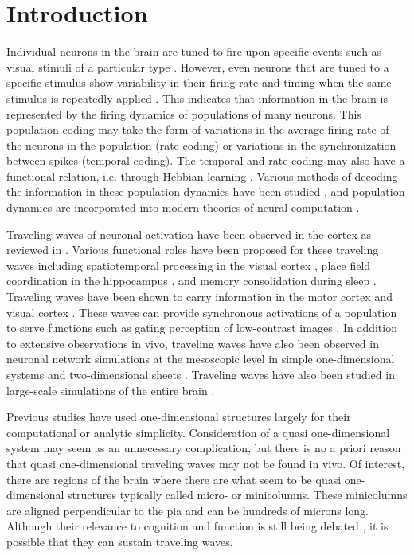 \documentclass[12pt]{article}
\begin{document}
\section{Introduction} 
Individual neurons in the brain are tuned to fire upon specific events such as visual stimuli of a particular type \parencite{Hubel1962} .
However, even neurons that are tuned to a specific stimulus show variability in their firing rate and timing when the same stimulus is repeatedly applied \parencite{Georgopoulos1982}\parencite{Newsome1989}.
This indicates that information in the brain is represented by the firing dynamics of populations of many neurons.
This population coding may take the form of variations in the average firing rate of the neurons in the population (rate coding) or variations in the synchronization between spikes (temporal coding).
The temporal and rate coding may also have a functional relation, i.e. through Hebbian learning \parencite{Basawaraj2019}.
Various methods of decoding the information in these population dynamics have been studied \parencite{Deneve1999}\parencite{Xu2019}, and population dynamics are incorporated into modern theories of neural computation \parencite{Pitkow2017}\parencite{Nadeau2020}.

Traveling waves of neuronal activation have been observed in the cortex as reviewed in \parencite{Muller2018}.
Various functional roles have been proposed for these traveling waves including spatiotemporal processing in the visual cortex \parencite{wu2008}\parencite{Muller2014}, place field coordination in the hippocampus \parencite{lubernov2009}, and memory consolidation during sleep \parencite{Dickey2021}.
Traveling waves have been shown to carry information in the  motor cortex \parencite{Rubino2006} and visual cortex \parencite{Besserve2015}.
These waves can provide synchronous activations of a population to serve functions such as gating perception of low-contrast images \parencite{Davis2020}.
In addition to extensive observations in vivo, traveling waves have also been observed in neuronal network simulations at the mesoscopic level in simple one-dimensional systems \parencite{Wilson1973}\parencite{Golomb1999} and two-dimensional sheets \parencite{keane2015}.
Traveling waves have also been studied in large-scale simulations of the entire brain \parencite{Roberts2019}.

Previous studies have used one-dimensional structures largely for their computational or analytic simplicity. 
Consideration of a quasi one-dimensional system may seem as an unnecessary complication, but there is no a priori reason that quasi one-dimensional traveling waves may not be found in vivo.
Of interest, there are regions of the brain where there are what seem to be quasi one-dimensional structures \parencite{mountcastle1997}\parencite{Cruz2009} typically called micro- or minicolumns. 
These minicolumns are aligned perpendicular to the pia and can be hundreds of microns long.  
Although their relevance to cognition and function is still being debated \parencite{horton2005}\parencite{buxhoeveden2002}, it is possible that they can sustain traveling waves.
\end{document}

